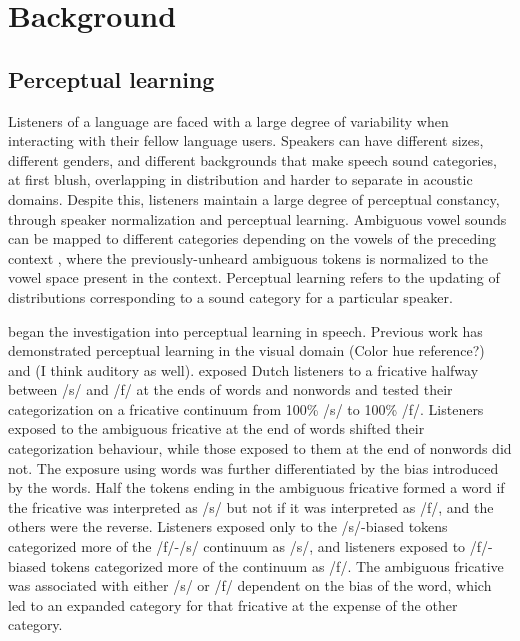 
\chapter{Background}

\section{Perceptual learning}


Listeners of a language are faced with a large degree of variability when interacting with their fellow language users.  
Speakers can have different sizes, different genders, and different backgrounds that make speech sound categories, at first blush, overlapping in distribution and harder to separate in acoustic domains.
Despite this, listeners maintain a large degree of perceptual constancy, through speaker normalization and perceptual learning.  
Ambiguous vowel sounds can be mapped to different categories depending on the vowels of the preceding context \citep{Ladefoged1957}, where the previously-unheard ambiguous tokens is normalized to the vowel space present in the context.  
Perceptual learning refers to the updating of distributions corresponding to a sound category for a particular speaker.

\citet{Norris2003} began the investigation into perceptual learning in speech. Previous work has demonstrated perceptual learning in the visual domain (Color hue reference?) and (I think auditory as well).  
\citet{Norris2003} exposed Dutch listeners to a fricative halfway between /s/ and /f/ at the ends of words and nonwords and tested their categorization on a fricative continuum from 100\% /s/ to 100\% /f/. 
 Listeners exposed to the ambiguous fricative at the end of words shifted their categorization behaviour, while those exposed to them at the end of nonwords did not.  The exposure using words was further differentiated by the bias introduced by the words.  
Half the tokens ending in the ambiguous fricative formed a word if the fricative was interpreted as /s/ but not if it was interpreted as /f/, and the others were the reverse.  
Listeners exposed only to the /s/-biased tokens categorized more of the /f/-/s/ continuum as /s/, and listeners exposed to /f/-biased tokens categorized more of the continuum as /f/.  
The ambiguous fricative was associated with either /s/ or /f/ dependent on the bias of the word, which led to an expanded category for that fricative at the expense of the other category.


